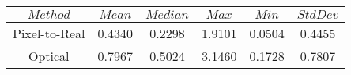 \begin{table}[h]
\centering
\begin{tabular}{|c|c|c|c|c|c|}
\hline
$Method$ & $Mean$ & $Median$ & $Max$ & $Min$ & $StdDev$ \\
\hline
Pixel-to-Real & 0.4340 & 0.2298 & 1.9101 & 0.0504 & 0.4455 \\
\hline
Optical & 0.7967 & 0.5024 & 3.1460 & 0.1728 & 0.7807 \\
\hline
\end{tabular}
\end{table}
